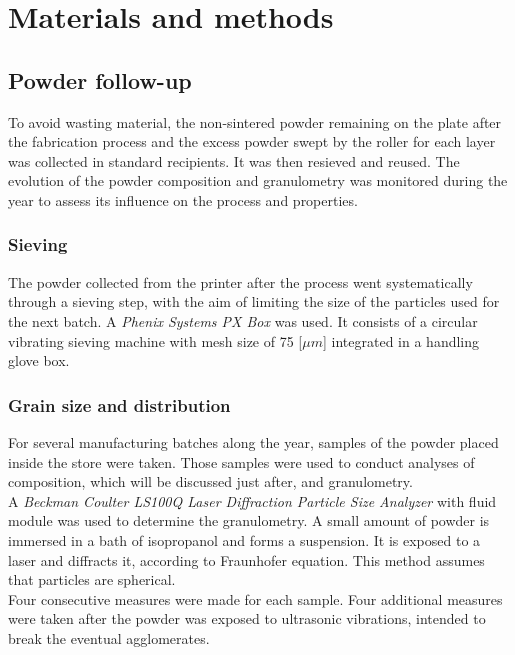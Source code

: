 \chapter{Materials and methods}
\label{Chap3}
\section{Powder follow-up}

To avoid wasting material, the non-sintered powder remaining on the plate after the fabrication process and the excess powder swept by the roller for each layer was collected in standard recipients. It was then resieved and reused. The evolution of the powder composition and granulometry was monitored during the year to assess its influence on the process and properties.

\subsection{Sieving}

The powder collected from the printer after the process went systematically through a sieving step, with the aim of limiting the size of the particles used for the next batch. A \textit{Phenix Systems PX Box} was used. It consists of a circular vibrating sieving machine with mesh size of 75 [$\mu m$] integrated in a handling glove box.

\subsection{Grain size and distribution}

For several manufacturing batches along the year, samples of the powder placed inside the store were taken. Those samples were used to conduct analyses of composition, which will be discussed just after, and granulometry.\\

A \textit{Beckman Coulter LS100Q Laser Diffraction Particle Size Analyzer} \cite{coulter} with fluid module was used to determine the granulometry. A small amount of powder is immersed in a bath of isopropanol and forms a suspension. It is exposed to a laser and diffracts it, according to Fraunhofer equation. This method assumes that particles are spherical.\\

Four consecutive measures were made for each sample. Four additional measures were taken after the powder was exposed to ultrasonic vibrations, intended to break the eventual agglomerates. 

